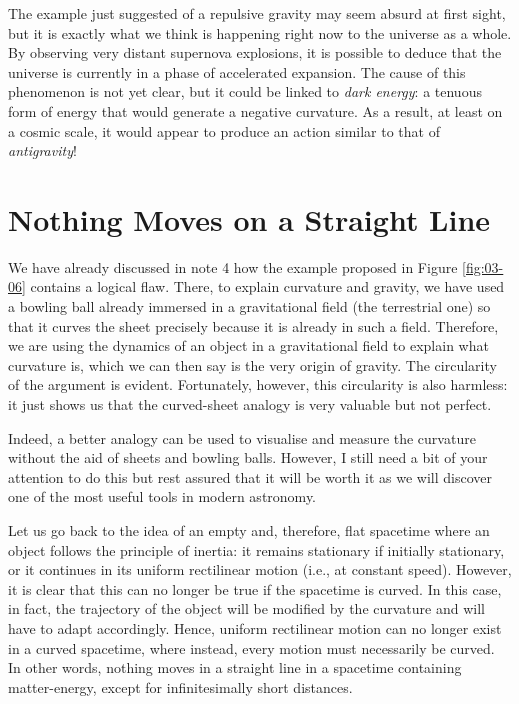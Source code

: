 The example just suggested of a repulsive gravity may seem absurd at first sight, but it
is exactly what we think is happening right now to the universe as a whole. By observing
very distant supernova explosions, it is possible to deduce that the
universe is currently in a phase of accelerated expansion. The cause of this phenomenon
is not yet clear, but it could be linked to \emph{dark
energy}: a tenuous form of energy that would
generate a negative curvature. As a result, at least on a cosmic scale, it would appear
to produce an action similar to that of \emph{antigravity}!

\section{Nothing Moves on a Straight Line}\label{sec:03-geodesics}

We have already discussed in note 4 how the example proposed in Figure \ref{fig:03-06} contains a
logical flaw. There, to explain curvature and gravity, we have used a bowling ball
already immersed in a gravitational field (the terrestrial one) so that it curves the
sheet precisely because it is already in such a field. Therefore, we are using the
dynamics of an object in a gravitational field to explain what curvature is, which we
can then say is the very origin of gravity. The circularity of the argument is evident.
Fortunately, however, this circularity is also harmless: it just shows us that the
curved-sheet analogy is very valuable but not perfect.

Indeed, a better analogy can be used to visualise and measure the curvature without the
aid of sheets and bowling balls. However, I still need a bit of your attention to do
this but rest assured that it will be worth it as we will discover one of the most
useful tools in modern astronomy.

Let us go back to the idea of an empty and, therefore, flat spacetime where an object
follows the principle of inertia: it remains stationary if initially stationary, or it
continues in its uniform rectilinear motion (i.e., at constant speed). However, it is
clear that this can no longer be true if the spacetime is curved. In this case, in fact,
the trajectory of the object will be modified by the curvature and will have to adapt
accordingly. Hence, uniform rectilinear motion can no longer exist in a curved
spacetime, where instead, every motion must necessarily be curved. In other words,
nothing moves in a straight line in a spacetime containing matter-energy, except for
infinitesimally short distances.

